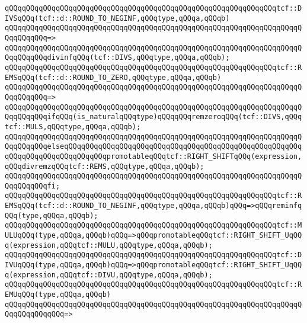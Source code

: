 \newline
\verb|qQQqqQQqqQQqqQQqqQQqqQQqqQQqqQQqqQQqqQQqqQQqqQQqqQQqqQQqqQQqqQQqtcf::DIVSqQQq(tcf::d::ROUND_TO_NEGINF,qQQqtype,qQQqa,qQQqb)|\newline
\verb|qQQqqQQqqQQqqQQqqQQqqQQqqQQqqQQqqQQqqQQqqQQqqQQqqQQqqQQqqQQqqQQqqQQqqQQqqQQqqQQq=>|\newline
\verb|qQQqqQQqqQQqqQQqqQQqqQQqqQQqqQQqqQQqqQQqqQQqqQQqqQQqqQQqqQQqqQQqqQQqqQQqqQQqqQQqdivinfqQQq(tcf::DIVS,qQQqtype,qQQqa,qQQqb);|\newline
\newline
\verb|qQQqqQQqqQQqqQQqqQQqqQQqqQQqqQQqqQQqqQQqqQQqqQQqqQQqqQQqqQQqqQQqtcf::REMSqQQq(tcf::d::ROUND_TO_ZERO,qQQqtype,qQQqa,qQQqb)|\newline
\verb|qQQqqQQqqQQqqQQqqQQqqQQqqQQqqQQqqQQqqQQqqQQqqQQqqQQqqQQqqQQqqQQqqQQqqQQqqQQqqQQq=>|\newline
\verb|qQQqqQQqqQQqqQQqqQQqqQQqqQQqqQQqqQQqqQQqqQQqqQQqqQQqqQQqqQQqqQQqqQQqqQQqqQQqqQQqifqQQq(is_naturalqQQqtype)qQQqqQQqremzeroqQQq(tcf::DIVS,qQQqtcf::MULS,qQQqtype,qQQqa,qQQqb);|\newline
\verb|qQQqqQQqqQQqqQQqqQQqqQQqqQQqqQQqqQQqqQQqqQQqqQQqqQQqqQQqqQQqqQQqqQQqqQQqqQQqqQQqelseqQQqqQQqqQQqqQQqqQQqqQQqqQQqqQQqqQQqqQQqqQQqqQQqqQQqqQQqqQQqqQQqqQQqqQQqqQQqqQQqpromotableqQQqtcf::RIGHT_SHIFTqQQq(expression,qQQqdivremzqQQqtcf::REMS,qQQqtype,qQQqa,qQQqb);|\newline
\verb|qQQqqQQqqQQqqQQqqQQqqQQqqQQqqQQqqQQqqQQqqQQqqQQqqQQqqQQqqQQqqQQqqQQqqQQqqQQqqQQqfi;|\newline
\newline
\verb|qQQqqQQqqQQqqQQqqQQqqQQqqQQqqQQqqQQqqQQqqQQqqQQqqQQqqQQqqQQqqQQqtcf::REMSqQQq(tcf::d::ROUND_TO_NEGINF,qQQqtype,qQQqa,qQQqb)qQQq=>qQQqreminfqQQq(type,qQQqa,qQQqb);|\newline
\verb|qQQqqQQqqQQqqQQqqQQqqQQqqQQqqQQqqQQqqQQqqQQqqQQqqQQqqQQqqQQqqQQqtcf::MULUqQQq(type,qQQqa,qQQqb)qQQq=>qQQqpromotableqQQqtcf::RIGHT_SHIFT_UqQQq(expression,qQQqtcf::MULU,qQQqtype,qQQqa,qQQqb);|\newline
\verb|qQQqqQQqqQQqqQQqqQQqqQQqqQQqqQQqqQQqqQQqqQQqqQQqqQQqqQQqqQQqqQQqtcf::DIVUqQQq(type,qQQqa,qQQqb)qQQq=>qQQqpromotableqQQqtcf::RIGHT_SHIFT_UqQQq(expression,qQQqtcf::DIVU,qQQqtype,qQQqa,qQQqb);|\newline
\newline
\verb|qQQqqQQqqQQqqQQqqQQqqQQqqQQqqQQqqQQqqQQqqQQqqQQqqQQqqQQqqQQqqQQqtcf::REMUqQQq(type,qQQqa,qQQqb)|\newline
\verb|qQQqqQQqqQQqqQQqqQQqqQQqqQQqqQQqqQQqqQQqqQQqqQQqqQQqqQQqqQQqqQQqqQQqqQQqqQQqqQQqqQQq=>|\newline
